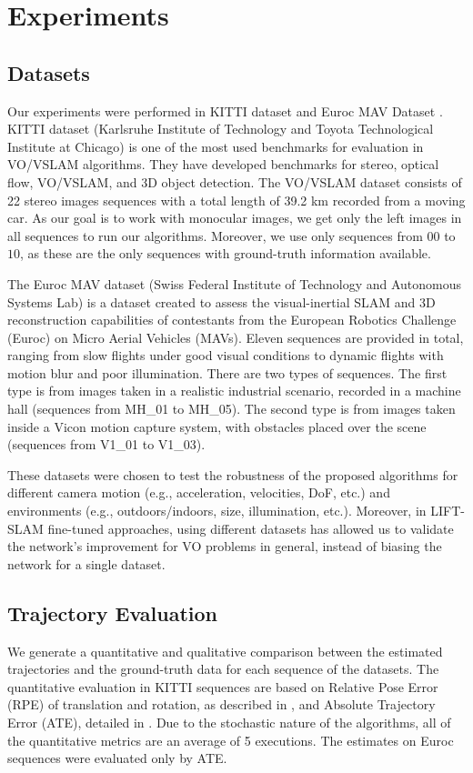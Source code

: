\section{Experiments}
\label{sec:experiments}

\subsection{Datasets}

Our experiments were performed in KITTI dataset \cite{kitti-dataset} and Euroc MAV Dataset \cite{euroc-mav}. KITTI dataset (Karlsruhe Institute of Technology and Toyota Technological Institute at Chicago) \cite{kitti-dataset} is one of the most used benchmarks for evaluation in VO/VSLAM algorithms. They have developed benchmarks for stereo, optical flow, VO/VSLAM, and 3D object detection. The VO/VSLAM dataset consists of 22 stereo images sequences with a total length of 39.2 km recorded from a moving car. As our goal is to work with monocular images, we get only the left images in all sequences to run our algorithms. Moreover, we use only sequences from $00$ to $10$, as these are the only sequences with ground-truth information available.

The Euroc MAV dataset (Swiss Federal Institute of Technology and Autonomous Systems Lab) \cite{euroc-mav} is a dataset created to assess the visual-inertial SLAM and 3D reconstruction capabilities of contestants from the European Robotics Challenge (Euroc) on Micro Aerial Vehicles (MAVs). Eleven sequences are provided in total, ranging from slow flights under good visual conditions to dynamic flights with motion blur and poor illumination. There are two types of sequences. The first type is from images taken in a realistic industrial scenario, recorded in a machine hall (sequences from MH\_01 to MH\_05). The second type is from images taken inside a Vicon motion capture system, with obstacles placed over the scene (sequences from V1\_01 to V1\_03).

These datasets were chosen to test the robustness of the proposed algorithms for different camera motion (e.g., acceleration, velocities, DoF, etc.) and environments (e.g., outdoors/indoors, size, illumination, etc.). Moreover, in LIFT-SLAM fine-tuned approaches, using different datasets has allowed us to validate the network's improvement for VO problems in general, instead of biasing the network for a single dataset.

\subsection{Trajectory Evaluation}
\label{sec:traj-evaluation}
We generate a quantitative and qualitative comparison between the estimated trajectories and the ground-truth data for each sequence of the datasets. The quantitative evaluation in KITTI sequences are based on Relative Pose Error (RPE) of translation and rotation, as described in \cite{kitti-benchmark}, and Absolute Trajectory Error (ATE), detailed in \cite{tum-vi}. Due to the stochastic nature of the algorithms, all of the quantitative metrics are an average of 5 executions. The estimates on Euroc sequences were evaluated only by ATE. 

